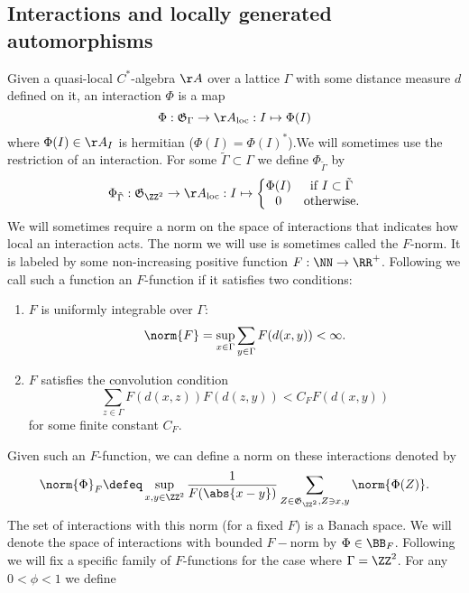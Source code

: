 \subsection{Interactions and locally generated automorphisms}
Given a quasi-local $C^*$-algebra $\AA$ over a lattice $\Gamma$ with some distance measure $d$ defined on it, an interaction $\Phi$ is a map
\begin{equation}
\Phi: \mathfrak{G}_{\Gamma}\rightarrow \AA_{\text{loc}}: I \mapsto \Phi(I)
\end{equation}
where $\Phi(I)\in\AA_I$ is hermitian ($\Phi(I)=\Phi(I)^*$).We will sometimes use the restriction of an interaction. For some $\tilde\Gamma\subset\Gamma$ we define $\Phi_{\tilde\Gamma}$ by
\begin{equation}
\Phi_{\tilde\Gamma}:\mathfrak{G}_{\ZZ^2}\rightarrow \AA_{\text{loc}}:I\mapsto\left\{\begin{matrix}
\Phi(I)&\text{if }I\subset\tilde\Gamma\\0&\text{otherwise}.
\end{matrix}\right.
\end{equation}
We will sometimes require a norm on the space of interactions that indicates how local an interaction acts. The norm we will use is sometimes called the $F$-norm. It is labeled by some non-increasing positive function $F:\NN\rightarrow \RR^+$. Following \cite{nachtergaele2019quasi} we call such a function an $F$-function if it satisfies two conditions:
\begin{enumerate}
	\item $F$ is uniformly integrable over $\Gamma$:
	\begin{equation}\label{eq:F_Is_Uniformly_Integrable_Over_Gamma}
	\norm{F}=\sup_{x\in\Gamma}\sum_{y\in\Gamma}F(d(x,y))<\infty.
	\end{equation}
	\item $F$ satisfies the convolution condition
	\begin{equation}
	\sum_{z\in\Gamma}F(d(x,z))F(d(z,y))< C_F F(d(x,y))
	\end{equation}
	for some finite constant $C_F$.
\end{enumerate}
Given such an $F$-function, we can define a norm on these interactions denoted by 
\begin{equation}
\norm{\Phi}_F\defeq \sup_{x,y\in\ZZ^2}\frac{1}{F(\abs{x-y})}\sum_{Z\in\mathfrak{G}_{\ZZ^2},Z\ni x,y}\norm{\Phi(Z)}.
\end{equation}
The set of interactions with this norm (for a fixed $F$) is a Banach space. We will denote the space of interactions with bounded $F-$norm by $\Phi\in\BB_F$. Following \cite{Ogata2d} we will fix a specific family of $F$-functions for the case where $\Gamma=\ZZ^2$. For any $0<\phi<1$ we define
